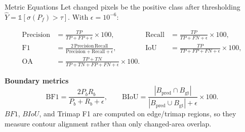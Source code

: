 \begin{frame}{Metric Equations}
    \small
    Let changed pixels be the positive class after thresholding
    \(\hat{Y}=\mathbb{1}[\sigma(P_f)>\tau]\). With \(\epsilon=10^{-6}\):

    \vspace{-0.2em}
    \begin{align*}
    \mathrm{Precision} &= \frac{TP}{TP+FP+\epsilon}\times100, &
    \mathrm{Recall} &= \frac{TP}{TP+FN+\epsilon}\times100,\\
    \mathrm{F1} &= \frac{2\,\mathrm{Precision}\,\mathrm{Recall}}
    {\mathrm{Precision}+\mathrm{Recall}+\epsilon}, &
    \mathrm{IoU} &= \frac{TP}{TP+FP+FN+\epsilon}\times100,\\
    \mathrm{OA} &= \frac{TP+TN}{TP+TN+FP+FN+\epsilon}\times100.
    \end{align*}

    \vspace{0.3em}
    \textbf{Boundary metrics}
    \[
    \mathrm{BF1}=\frac{2P_bR_b}{P_b+R_b+\epsilon},\qquad
    \mathrm{BIoU}=\frac{|B_{\mathrm{pred}}\cap B_{\mathrm{gt}}|}
    {|B_{\mathrm{pred}}\cup B_{\mathrm{gt}}|+\epsilon}\times100.
    \]
    \scriptsize
    \(BF1\), \(BIoU\), and Trimap F1 are computed on edge/trimap regions, so they measure contour alignment rather than only changed-area overlap.
\end{frame}
